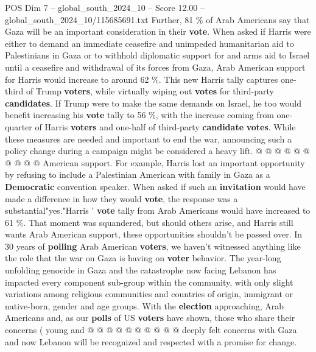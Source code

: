 \begin{textsample}{POS Dim 7 – global\_south\_2024\_10 – Score 12.00 – global\_south\_2024\_10/115685691.txt}
Further, 81 \% of Arab Americans say that Gaza will be an important consideration in their \textbf{vote}.
When asked if Harris were either to demand an immediate ceasefire and unimpeded humanitarian aid to Palestinians in Gaza or to withhold diplomatic support for and arms aid to Israel until a ceasefire and withdrawal of its forces from Gaza, Arab American support for Harris would increase to around 62 \%.
This new Harris tally captures one-third of Trump \textbf{voters}, while virtually wiping out \textbf{votes} for third-party \textbf{candidates}.
If Trump were to make the same demands on Israel, he too would benefit increasing his \textbf{vote} tally to 56 \%, with the increase coming from one-quarter of Harris \textbf{voters} and one-half of third-party \textbf{candidate} \textbf{votes}.
While these measures are needed and important to end the war, announcing such a policy change during a campaign might be considered a heavy lift. @ @ @ @ @ @ @ @ @ @ American support.
For example, Harris lost an important opportunity by refusing to include a Palestinian American with family in Gaza as a \textbf{Democratic} convention speaker.
When asked if such an \textbf{invitation} would have made a difference in how they would \textbf{vote}, the response was a substantial"yes."Harris ' \textbf{vote} tally from Arab Americans would have increased to 61 \%.
That moment was squandered, but should others arise, and Harris still wants Arab American support, these opportunities shouldn't be passed over.
In 30 years of \textbf{polling} Arab American \textbf{voters}, we haven't witnessed anything like the role that the war on Gaza is having on \textbf{voter} behavior.
The year-long unfolding genocide in Gaza and the catastrophe now facing Lebanon has impacted every component sub-group within the community, with only slight variations among religious communities and countries of origin, immigrant or native-born, gender and age groups.
With the \textbf{election} approaching, Arab Americans and, as our \textbf{polls} of US \textbf{voters} have shown, those who share their concerns ( young and @ @ @ @ @ @ @ @ @ @ deeply felt concerns with Gaza and now Lebanon will be recognized and respected with a promise for change.

\end{textsample}
